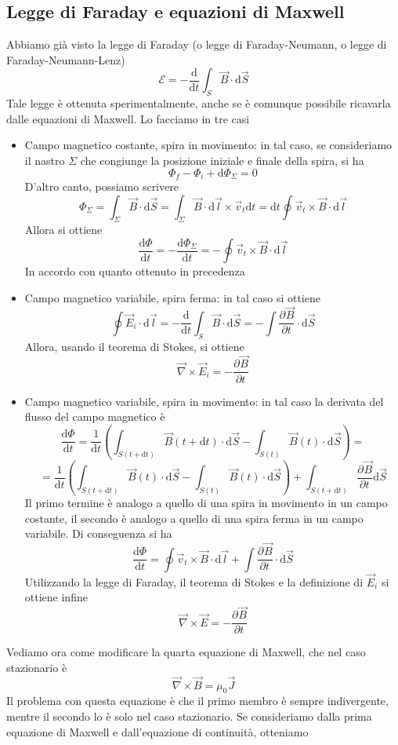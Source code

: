\documentclass[a4paper,11pt]{book}
\let\oldnabla\nabla
\renewcommand{\nabla}{\vec{\oldnabla}}
\newcommand{\der}[3][]{\frac{\partial ^{#1}#2}{\partial #3^{#1}}}
\newcommand{\dif}{\mathrm{d}}
\theoremstyle{definition}
\theoremstyle{theorem}
\begin{document}
\subsection{Legge di Faraday e equazioni di Maxwell}
Abbiamo già visto la legge di Faraday (o legge di Faraday-Neumann, o legge di Faraday-Neumann-Lenz)
\[\mathcal{E}=-\frac{\dif}{\dif t}\int_S\vec{B}\cdot\dif\vec{S}\]
Tale legge è ottenuta sperimentalmente, anche se è comunque possibile ricavarla dalle equazioni di Maxwell. Lo facciamo in tre casi
\begin{itemize}
	\item Campo magnetico costante, spira in movimento: in tal caso, se consideriamo il nastro $\Sigma$ che congiunge la posizione iniziale e finale della spira, si ha
	\[\Phi_f-\Phi_i+\dif\Phi_\Sigma=0\]
	D'altro canto, possiamo scrivere
	\[\Phi_\Sigma=\int_{\Sigma}\vec{B}\cdot\dif\vec{S}=\int_{\Sigma}\vec{B}\cdot\dif\vec{l}\times\vec{v}_t\dif t=\dif t\oint\vec{v}_t\times\vec{B}\cdot\dif\vec{l}\]
	Allora si ottiene
	\[\frac{\dif \Phi}{\dif t}=-\frac{\dif\Phi_\Sigma}{\dif t}=-\oint\vec{v}_t\times\vec{B}\cdot\dif\vec{l}\]
	In accordo con quanto ottenuto in precedenza
	\item Campo magnetico variabile, spira ferma: in tal caso si ottiene
	\[\oint\vec{E}_i\cdot\dif\vec{l}=-\frac{\dif}{\dif t}\int_S\vec{B}\cdot\dif\vec{S}=-\int\der{\vec{B}}{t}\cdot\dif\vec{S}\]
	Allora, usando il teorema di Stokes, si ottiene
	\[\nabla\times\vec{E}_i=-\der{\vec{B}}{t}\]
	\item Campo magnetico variabile, spira in movimento: in tal caso la derivata del flusso del campo magnetico è
	\[\frac{\dif\Phi}{\dif t}=\frac{1}{\dif t}\left(\int_{S(t+\dif t)}\vec{B}(t+\dif t)\cdot\dif\vec{S}-\int_{S(t)}\vec{B}(t)\cdot\dif\vec{S}\right)=\]\[=\frac{1}{\dif t}\left(\int_{S(t+\dif t)}\vec{B}(t)\cdot\dif\vec{S}-\int_{S(t)}\vec{B}(t)\cdot\dif\vec{S}\right)+\int_{S(t+\dif t)}\der{\vec{B}}{t}\dif\vec{S}\]
	Il primo termine è analogo a quello di una spira in movimento in un campo costante, il secondo è analogo a quello di una spira ferma in un campo variabile. Di conseguenza si ha
	\[\frac{\dif\Phi}{\dif t}=\oint \vec{v}_t\times\vec{B}\cdot\dif\vec{l}+\int\der{\vec{B}}{t}\cdot\dif\vec{S}\]
	Utilizzando la legge di Faraday, il teorema di Stokes e la definizione di $\vec{E}_i$ si ottiene infine
	\[\nabla\times\vec{E}=-\der{\vec{B}}{t}\]
\end{itemize}
Vediamo ora come modificare la quarta equazione di Maxwell, che nel caso stazionario è
\[\nabla\times\vec{B}=\mu_0\vec{J}\]
Il problema con questa equazione è che il primo membro è sempre indivergente, mentre il secondo lo è solo nel caso stazionario. Se consideriamo dalla prima equazione di Maxwell e dall'equazione di continuità, otteniamo
\end{document}
